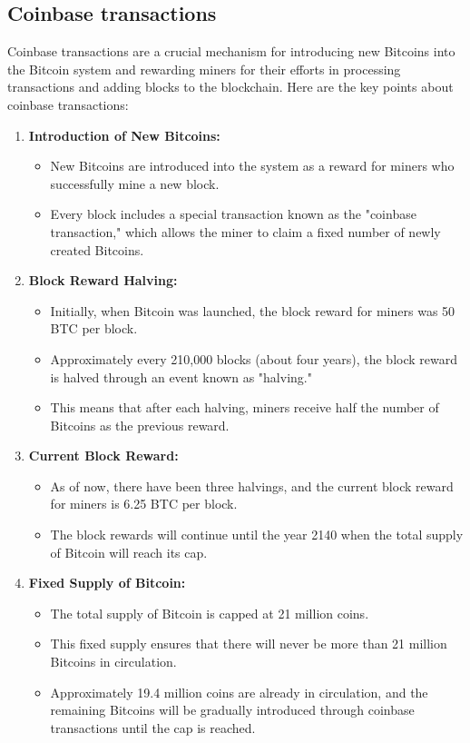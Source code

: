 \documentclass{report}
\begin{document}
\subsection{Coinbase transactions}
Coinbase transactions are a crucial mechanism for introducing new Bitcoins into the Bitcoin system and rewarding miners for their efforts in processing transactions and adding blocks to the blockchain. Here are the key points about coinbase transactions:
\begin{enumerate}
	\item \textbf{Introduction of New Bitcoins:}
	\begin{itemize}
		\item New Bitcoins are introduced into the system as a reward for miners who successfully mine a new block.
		\item Every block includes a special transaction known as the "coinbase transaction," which allows the miner to claim a fixed number of newly created Bitcoins.
	\end{itemize}
	\item \textbf{Block Reward Halving:}
	\begin{itemize}
		\item Initially, when Bitcoin was launched, the block reward for miners was 50 BTC per block.
		\item Approximately every 210,000 blocks (about four years), the block reward is halved through an event known as "halving."
		\item This means that after each halving, miners receive half the number of Bitcoins as the previous reward.
	\end{itemize}
	\item \textbf{Current Block Reward:}
	\begin{itemize}
		\item As of now, there have been three halvings, and the current block reward for miners is 6.25 BTC per block.
		\item The block rewards will continue until the year 2140 when the total supply of Bitcoin will reach its cap.
	\end{itemize}
	\item \textbf{Fixed Supply of Bitcoin:}
	\begin{itemize}
		\item The total supply of Bitcoin is capped at 21 million coins.
		\item This fixed supply ensures that there will never be more than 21 million Bitcoins in circulation.
		\item Approximately 19.4 million coins are already in circulation, and the remaining Bitcoins will be gradually introduced through coinbase transactions until the cap is reached.

\end{itemize}
\end{enumerate}
\end{document}
